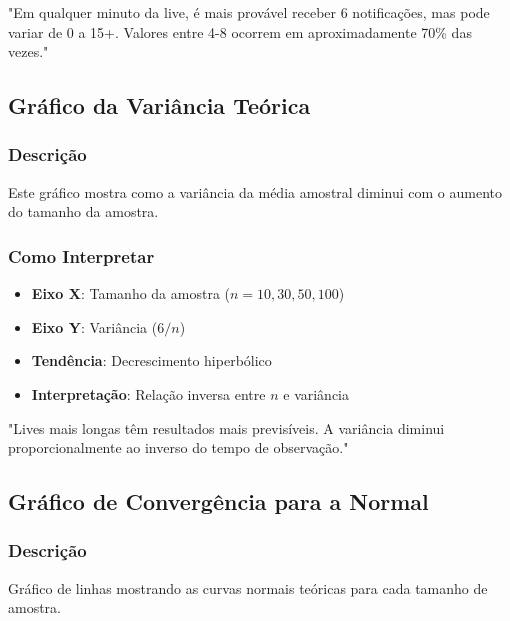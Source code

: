 \documentclass[12pt,a4paper]{article}
\begin{document}
\begin{aplicacao}
"Em qualquer minuto da live, é mais provável receber 6 notificações, mas pode variar de 0 a 15+. Valores entre 4-8 ocorrem em aproximadamente 70\% das vezes."
\end{aplicacao}

\subsection{Gráfico da Variância Teórica}

\subsubsection{Descrição}
Este gráfico mostra como a variância da média amostral diminui com o aumento do tamanho da amostra.

\subsubsection{Como Interpretar}
\begin{itemize}
    \item \textbf{Eixo X}: Tamanho da amostra ($n = 10, 30, 50, 100$)
    \item \textbf{Eixo Y}: Variância ($6/n$)
    \item \textbf{Tendência}: Decrescimento hiperbólico
    \item \textbf{Interpretação}: Relação inversa entre $n$ e variância
\end{itemize}

\begin{aplicacao}
"Lives mais longas têm resultados mais previsíveis. A variância diminui proporcionalmente ao inverso do tempo de observação."
\end{aplicacao}


\subsection{Gráfico de Convergência para a Normal}

\subsubsection{Descrição}
Gráfico de linhas mostrando as curvas normais teóricas para cada tamanho de amostra.
\end{document}
